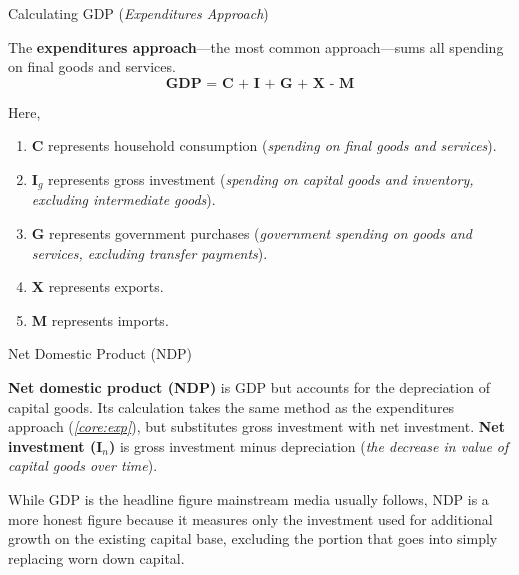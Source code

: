 \documentclass[10pt]{article}
\begin{document}
    \begin{core}[label=core:exp]{Calculating GDP (\textit{Expenditures Approach})}

      The \textbf{expenditures approach}---the most common approach---sums all spending on final goods and services.
      \[
        \textbf{GDP = C + I + G + X - M}
      \]

      Here,

      \begin{enumerate}

        \item \textbf{C} represents household consumption (\textit{spending on final goods and services}).

        \item \textbf{I$_g$} represents gross investment (\textit{spending on capital goods and inventory, excluding intermediate goods}).

        \item \textbf{G} represents government purchases (\textit{government spending on goods and services, excluding transfer payments}).

        \item \textbf{X} represents exports.

        \item \textbf{M} represents imports.

      \end{enumerate}

    \end{core}

    \begin{core}[label=core:ndp]{Net Domestic Product (NDP)}

      \textbf{Net domestic product (NDP)} is GDP but accounts for the depreciation of capital goods. Its calculation takes the same method as the expenditures approach (\textit{\autoref{core:exp}}), but substitutes gross investment with net investment. \textbf{Net investment (I$_n$)} is gross investment minus depreciation (\textit{the decrease in value of capital goods over time}).

      While GDP is the headline figure mainstream media usually follows, NDP is a more honest figure because it measures only the investment used for additional growth on the existing capital base, excluding the portion that goes into simply replacing worn down capital.

    \end{core}
\end{document}
